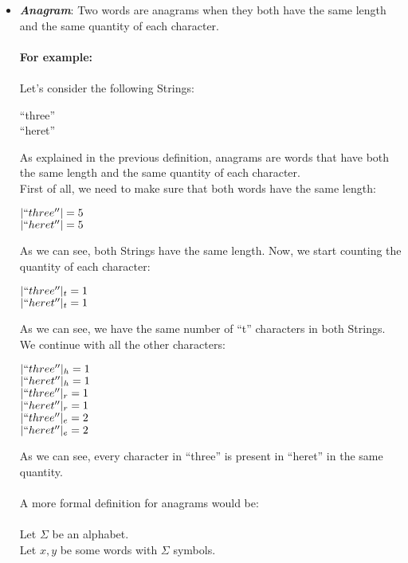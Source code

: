 \documentclass{article}
\begin{document}
\begin{itemize}
		\item \emph{\textbf{Anagram}}: Two words are anagrams when
		they both have the same length and the same quantity of each
		character.
		\\
		\\
		\textbf{For example:}
		\\
		\\
		Let's consider the following Strings:
		\begin{center}
			``three''
			\\
			``heret''
			\\
		\end{center}
		As explained in the previous definition, anagrams are words
		that have both the same length and the same quantity of each
		character.
		\\
		First of all, we need to make sure that both words have the same
		length:
		\begin{center}
			$|``three''| = 5$
			\\
			$|``heret''| = 5$
			\\
		\end{center}
		As we can see, both Strings have the same length.
		Now, we start counting the quantity of each character:
		\begin{center}
			$|``three''|_t = 1$
			\\
			$|``heret''|_t = 1$
			\\
		\end{center}
		As we can see, we have the same number of ``t'' characters
		in both Strings. We continue with all the other characters:
		\begin{center}
			$|``three''|_h = 1$
			\\
			$|``heret''|_h = 1$
			\\
			$|``three''|_r = 1$
			\\
			$|``heret''|_r = 1$
			\\
			$|``three''|_e = 2$
			\\
			$|``heret''|_e = 2$
			\\
		\end{center}
		As we can see, every character in ``three'' is present
		in ``heret'' in the same quantity.
		\\
		\\
		A more formal definition for anagrams would be:
		\\
		\\
		Let $\Sigma$ be an alphabet.
		\\
		Let $x, y$ be some words with $\Sigma$ symbols.

\end{itemize}
\end{document}
